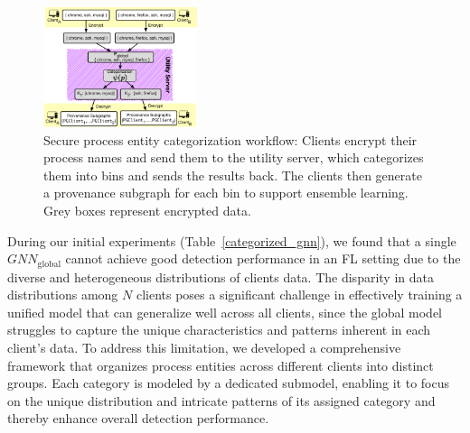 \begin{figure}[t!]
    \centering
    \includegraphics[width=0.4\textwidth]{fig/categorization_flow.pdf}
    \caption{Secure process entity categorization workflow: Clients encrypt their process names and send them to the utility server, which categorizes them into bins and sends the results back. The clients then generate a provenance subgraph for each bin to support \gnnshort ensemble learning. Grey boxes represent encrypted data.}
    \label{proc:cate}
    \vspace{-3ex}
  \end{figure}

During our initial experiments (Table~\ref{categorized_gnn}), we found that a single \( {GNN}_{\text{global}} \) cannot achieve good detection performance in an FL setting due to the diverse and heterogeneous distributions of clients data. The disparity in data distributions among \( N \) clients poses a significant challenge in effectively training a unified model that can generalize well across all clients, since the global model struggles to capture the unique characteristics and patterns inherent in each client's data. To address this limitation, we developed a comprehensive framework that organizes process entities across different clients into distinct groups. Each category is modeled by a dedicated submodel, enabling it to focus on the unique distribution and intricate patterns of its assigned category and thereby enhance overall detection performance.


